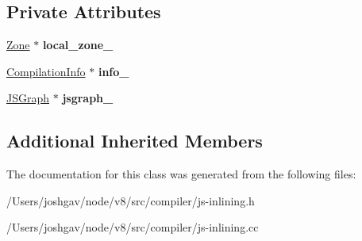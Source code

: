 \subsection*{Private Attributes}
\begin{DoxyCompactItemize}
\item 
\hyperlink{classv8_1_1internal_1_1_zone}{Zone} $\ast$ {\bfseries local\+\_\+zone\+\_\+}\hypertarget{classv8_1_1internal_1_1compiler_1_1_j_s_inliner_afc7ecb45893b942cc33eb4de9da30902}{}\label{classv8_1_1internal_1_1compiler_1_1_j_s_inliner_afc7ecb45893b942cc33eb4de9da30902}

\item 
\hyperlink{classv8_1_1internal_1_1_compilation_info}{Compilation\+Info} $\ast$ {\bfseries info\+\_\+}\hypertarget{classv8_1_1internal_1_1compiler_1_1_j_s_inliner_a370501c1d6bae52496e279d286c80e4b}{}\label{classv8_1_1internal_1_1compiler_1_1_j_s_inliner_a370501c1d6bae52496e279d286c80e4b}

\item 
\hyperlink{classv8_1_1internal_1_1compiler_1_1_j_s_graph}{J\+S\+Graph} $\ast$ {\bfseries jsgraph\+\_\+}\hypertarget{classv8_1_1internal_1_1compiler_1_1_j_s_inliner_aa3375c1d71f69e5e4a749fd1144a8719}{}\label{classv8_1_1internal_1_1compiler_1_1_j_s_inliner_aa3375c1d71f69e5e4a749fd1144a8719}

\end{DoxyCompactItemize}
\subsection*{Additional Inherited Members}


The documentation for this class was generated from the following files\+:\begin{DoxyCompactItemize}
\item 
/\+Users/joshgav/node/v8/src/compiler/js-\/inlining.\+h\item 
/\+Users/joshgav/node/v8/src/compiler/js-\/inlining.\+cc\end{DoxyCompactItemize}

